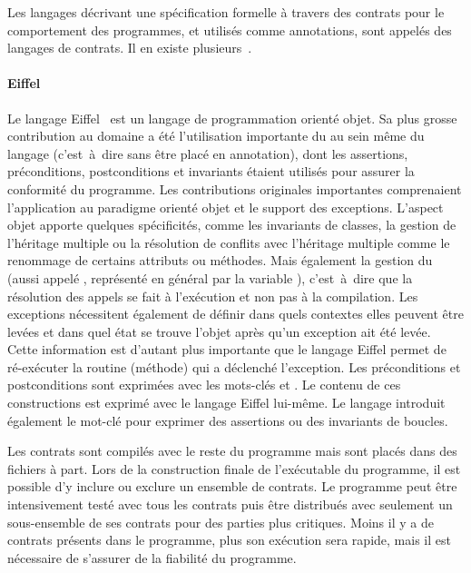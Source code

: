 Les langages décrivant une spécification formelle à travers des contrats pour le
comportement des programmes, et utilisés comme annotations, sont appelés des
{\strong langages de contrats}. Il en existe plusieurs~.

\paragraph{Eiffel} Le langage Eiffel~ est un langage de
programmation orienté objet. Sa plus grosse contribution au domaine a été
l'utilisation importante du  au sein même du
langage (c'est~à~dire sans être placé en annotation), dont les assertions,
préconditions, postconditions et invariants étaient utilisés pour assurer la
conformité du programme. Les contributions originales importantes comprenaient
l'application au paradigme orienté objet et le support des exceptions. L'aspect
objet apporte quelques spécificités, comme les invariants de classes, la gestion
de l'héritage multiple ou la résolution de conflits avec l'héritage multiple
comme le renommage de certains attributs ou méthodes. Mais également la gestion
du  (aussi appelé ,
représenté en général par la variable ), c'est~à~dire que la
résolution des appels se fait à l'exécution et non pas à la compilation. Les
exceptions nécessitent également de définir dans quels contextes elles peuvent
être levées et dans quel état se trouve l'objet après qu'un exception ait été
levée. Cette information est d'autant plus importante que le langage Eiffel
permet de ré-exécuter la routine (méthode) qui a déclenché l'exception. Les
préconditions et postconditions sont exprimées avec les mots-clés 
et . Le contenu de ces constructions est exprimé avec le langage
Eiffel lui-même. Le langage introduit également le mot-clé  pour
exprimer des assertions ou des invariants de boucles.

Les contrats sont compilés avec le reste du programme mais sont placés dans des
fichiers à part. Lors de la construction finale de l'exécutable du programme, il
est possible d'y inclure ou exclure un ensemble de contrats. Le programme peut
être intensivement testé avec tous les contrats puis être distribués avec
seulement un sous-ensemble de ses contrats pour des parties plus critiques.
Moins il y a de contrats présents dans le programme, plus son exécution sera
rapide, mais il est nécessaire de s'assurer de la fiabilité du programme.

